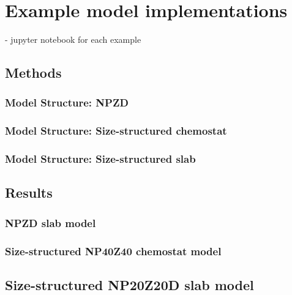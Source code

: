 \documentclass[journal abbreviation, manuscript]{copernicus}
\begin{document}
\section{Example model implementations}
- jupyter notebook for each example

\subsection{Methods}

\subsubsection{Model Structure: NPZD}

\subsubsection{Model Structure: Size-structured chemostat}

\subsubsection{Model Structure: Size-structured slab}

\subsection{Results}

\subsubsection{NPZD slab model}

\subsubsection{Size-structured NP40Z40 chemostat model}

\subsection{Size-structured NP20Z20D slab model}
\end{document}
